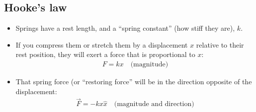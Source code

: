 \documentclass[aspectratio=169,
hyperref={colorlinks,urlcolor=blue}
]{beamer}
\begin{document}
\subsection{Hooke's law}
\label{subsec:hookeslaw}
{
\begin{itemize}
\item Springs have a rest length, and a “spring constant” (how stiff they are), $k$.
\item If you compress them or stretch them by a displacement $x$ relative to their rest position, they will exert a force that is proportional to $x$:
\begin{align*}
F=kx\quad \text{(magnitude)}
\end{align*}
\item That spring force (or ``restoring force'' will be in the direction opposite of the displacement:
\begin{align*}
\vec F=-kx\hat x\quad \text{(magnitude and direction)}
\end{align*}
\end{itemize}
}
\end{document}

